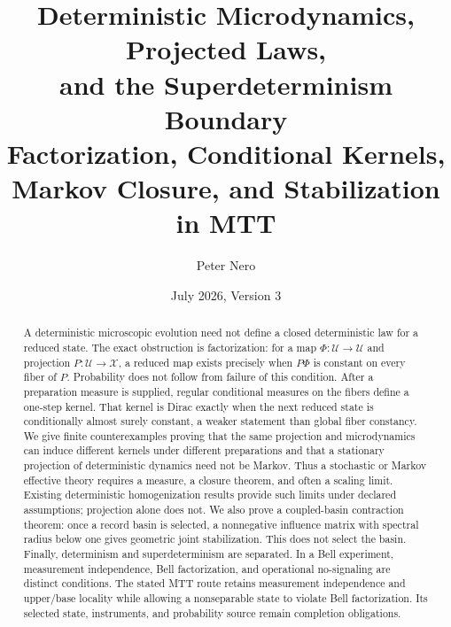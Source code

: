 \documentclass[11pt]{article}
\title{Deterministic Microdynamics, Projected Laws,\\
and the Superdeterminism Boundary\\
\large Factorization, Conditional Kernels, Markov Closure, and Stabilization in MTT}
\author{Peter Nero}
\date{July 2026, Version 3}
\newcommand{\Uu}{\mathcal U}
\newcommand{\Xx}{\mathcal X}
\begin{document}
\maketitle

\begin{abstract}
A deterministic microscopic evolution need not define a closed deterministic
law for a reduced state. The exact obstruction is factorization: for a map
\(\Phi:\Uu\to\Uu\) and projection \(P:\Uu\to\Xx\), a reduced map exists
precisely when \(P\Phi\) is constant on every fiber of \(P\). Probability does
not follow from failure of this condition. After a preparation measure is
supplied, regular conditional measures on the fibers define a one-step
kernel. That kernel is Dirac exactly when the next reduced state is
conditionally almost surely constant, a weaker statement than global fiber
constancy. We give finite counterexamples proving that the same projection and
microdynamics can induce different kernels under different preparations and
that a stationary projection of deterministic dynamics need not be Markov.
Thus a stochastic or Markov effective theory requires a measure, a closure
theorem, and often a scaling limit. Existing deterministic homogenization
results provide such limits under declared assumptions; projection alone does
not. We also prove a coupled-basin contraction theorem: once a record basin is
selected, a nonnegative influence matrix with spectral radius below one gives
geometric joint stabilization. This does not select the basin. Finally,
determinism and superdeterminism are separated. In a Bell experiment,
measurement independence, Bell factorization, and operational no-signaling
are distinct conditions. The stated MTT route retains measurement
independence and upper/base locality while allowing a nonseparable state to
violate Bell factorization. Its selected state, instruments, and probability
source remain completion obligations.
\end{abstract}
\end{document}
